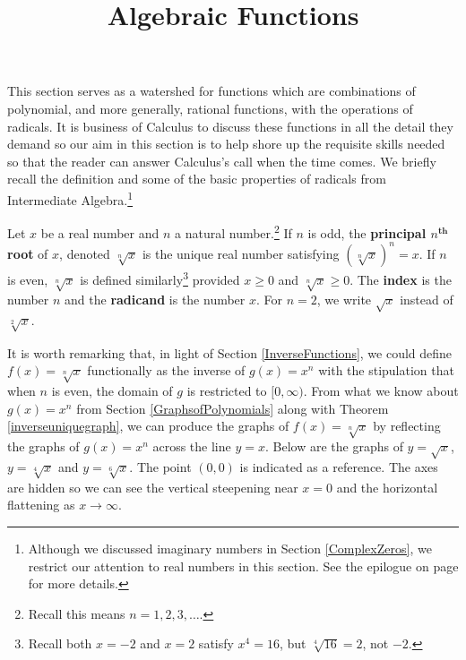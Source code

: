 \documentclass[12pt]{ximera}
\title{Algebraic Functions}
\begin{document}
\maketitle

\setcounter{footnote}{0}

\label{AlgebraicFunctions}

This section serves as a watershed for functions which are combinations of polynomial, and more generally, rational functions, with the operations of radicals.  It is business of Calculus to discuss these functions in all the detail they demand so our aim in this section is to help shore up the requisite skills needed so that the reader can answer Calculus's call when the time comes.   We briefly recall the definition and some of the basic properties of radicals from Intermediate Algebra.\footnote{Although we discussed imaginary numbers in Section \ref{ComplexZeros}, we restrict our attention to real numbers in this section.  See the epilogue on page \pageref{complexepilogue} for more details.} 

\smallskip


\begin{definition} \label{principalnthrootdefn} Let $x$ be a real number and $n$ a natural number.\footnote{Recall this means $n=1,2,3,\ldots$.} If $n$ is odd, the   \textbf{principal \boldmath $n^{\textbf{th}}$ root} of $x$, denoted $\sqrt[n]{x}$ is the unique real number satisfying $\left(\sqrt[n]{x}\right)^n = x$.  If $n$ is even, $\sqrt[n]{x}$ is defined similarly\footnote{Recall both $x=-2$ and $x=2$ satisfy $x^4=16$, but $\sqrt[4]{16} =2$, not $-2$.} provided  $x \geq 0$ and $\sqrt[n]{x} \geq 0$.  The   \textbf{index} is the number $n$ and the   \textbf{radicand} is the number $x$.  For $n=2$, we write $\sqrt{x}$ instead of $\sqrt[2]{x}$.

\end{definition}


\smallskip

It is worth remarking that, in light of Section \ref{InverseFunctions}, we could define $f(x) = \sqrt[n]{x}$ functionally as the inverse of $g(x) = x^n$ with the stipulation that when $n$ is even, the domain of $g$ is restricted to $[0, \infty)$. From what we know about $g(x) = x^n$ from Section \ref{GraphsofPolynomials} along with Theorem \ref{inverseuniquegraph}, we can produce the graphs of $f(x) = \sqrt[n]{x}$ by reflecting the graphs of $g(x) = x^n$ across the line $y=x$.  Below are the graphs of $y=\sqrt{x}$, $y=\sqrt[4]{x}$ and $y=\sqrt[6]{x}$.  The point $(0,0)$ is indicated as a reference.  The axes are hidden so we can see the vertical steepening near $x=0$ and the horizontal flattening as $x \rightarrow \infty$.
\end{document}
